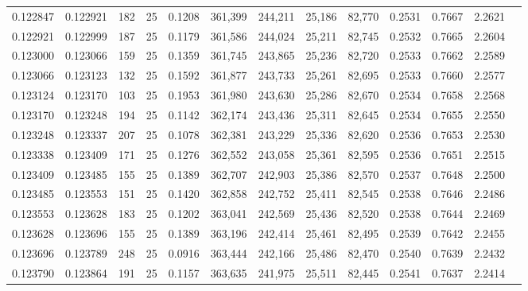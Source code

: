 \begin{tabular}{rrrrrrrrrrrrr}
0.122847 & 0.122921 &   182 &  25 &                                     0.1208 & 361,399 & 244,211 &  25,186 &  82,770 & 0.2531 & 0.7667 & 2.2621 \\
0.122921 & 0.122999 &   187 &  25 &                                     0.1179 & 361,586 & 244,024 &  25,211 &  82,745 & 0.2532 & 0.7665 & 2.2604 \\
0.123000 & 0.123066 &   159 &  25 &                                     0.1359 & 361,745 & 243,865 &  25,236 &  82,720 & 0.2533 & 0.7662 & 2.2589 \\
0.123066 & 0.123123 &   132 &  25 &                                     0.1592 & 361,877 & 243,733 &  25,261 &  82,695 & 0.2533 & 0.7660 & 2.2577 \\
0.123124 & 0.123170 &   103 &  25 &                                     0.1953 & 361,980 & 243,630 &  25,286 &  82,670 & 0.2534 & 0.7658 & 2.2568 \\
0.123170 & 0.123248 &   194 &  25 &                                     0.1142 & 362,174 & 243,436 &  25,311 &  82,645 & 0.2534 & 0.7655 & 2.2550 \\
0.123248 & 0.123337 &   207 &  25 &                                     0.1078 & 362,381 & 243,229 &  25,336 &  82,620 & 0.2536 & 0.7653 & 2.2530 \\
0.123338 & 0.123409 &   171 &  25 &                                     0.1276 & 362,552 & 243,058 &  25,361 &  82,595 & 0.2536 & 0.7651 & 2.2515 \\
0.123409 & 0.123485 &   155 &  25 &                                     0.1389 & 362,707 & 242,903 &  25,386 &  82,570 & 0.2537 & 0.7648 & 2.2500 \\
0.123485 & 0.123553 &   151 &  25 &                                     0.1420 & 362,858 & 242,752 &  25,411 &  82,545 & 0.2538 & 0.7646 & 2.2486 \\
0.123553 & 0.123628 &   183 &  25 &                                     0.1202 & 363,041 & 242,569 &  25,436 &  82,520 & 0.2538 & 0.7644 & 2.2469 \\
0.123628 & 0.123696 &   155 &  25 &                                     0.1389 & 363,196 & 242,414 &  25,461 &  82,495 & 0.2539 & 0.7642 & 2.2455 \\
0.123696 & 0.123789 &   248 &  25 &                                     0.0916 & 363,444 & 242,166 &  25,486 &  82,470 & 0.2540 & 0.7639 & 2.2432 \\
0.123790 & 0.123864 &   191 &  25 &                                     0.1157 & 363,635 & 241,975 &  25,511 &  82,445 & 0.2541 & 0.7637 & 2.2414 \\

\end{tabular}
